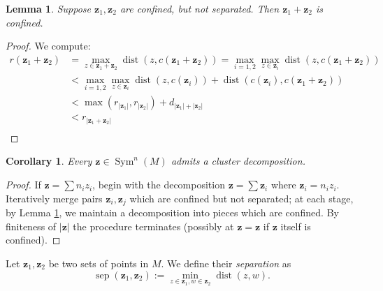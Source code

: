 \documentclass{article}
\def\C{\mathbb{C}}
\DeclareMathOperator{\Sym}{Sym}
\DeclareMathOperator{\dist}{dist}
\DeclareMathOperator{\sep}{sep}
\def\bz{\mathbf{z}} %
\newtheorem{lemma}[theorem]{Lemma}
\newtheorem{corollary}[theorem]{Corollary}
\theoremstyle{definition}
\begin{document}
\begin{lemma} \label{merging lemma}
    Suppose $\mathbf{z}_1, \mathbf{z}_2$ are confined, but not separated.  Then $\mathbf{z}_1 + \mathbf{z}_2$ is confined.  
\end{lemma}
\begin{proof} We compute: 
    \begin{align*}
    r(\mathbf{z}_1 + \mathbf{z}_2) &= \max_{z \in \mathbf{z}_1 + \mathbf{z}_2} \dist(z, c(\mathbf{z}_1 + \mathbf{z}_2)) = \max_{i=1,2} \max_{z \in \mathbf{z}_i} \dist(z, c(\mathbf{z}_1 + \mathbf{z}_2)) \\
    & < \max_{i=1,2} \max_{z \in \mathbf{z}_i} \dist(z, c(\mathbf{z}_i)) + \dist(c(\mathbf{z}_i),c(\mathbf{z}_1 + \mathbf{z}_2)) \\
    & < \max(r_{|\mathbf{z}_1|}, r_{|\mathbf{z}_2|}) + d_{|\mathbf{z}_1| + |\mathbf{z}_2|} \\
    &< r_{|\mathbf{z}_1 + \mathbf{z}_2|}\\
\end{align*}  
\end{proof}



\begin{corollary}
Every $\mathbf{z} \in \Sym^n(M)$ admits a cluster decomposition.
\end{corollary}
\begin{proof}
    If $\mathbf{z} = \sum n_i z_i$, begin with the decomposition $\mathbf{z} = \sum \mathbf{z}_i$ where $\mathbf{z}_i = n_i z_i$.      
    Iteratively merge pairs $\mathbf{z}_i, \mathbf{z}_j$ which are confined but not separated; at each stage, by Lemma \ref{merging lemma}, we maintain a decomposition into pieces which are confined.  By finiteness of $|\mathbf{z}|$ the procedure terminates (possibly at $\mathbf{z} = \mathbf{z}$ if $\mathbf{z}$ itself is confined). 
\end{proof}
Let $\bz_1, \bz_2$ be two sets of points in $M$. We define their {\em separation} as
$$ \sep(\mathbf{z}_1, \mathbf{z}_2) := \min_{z \in \mathbf{z}_1, w \in  \mathbf{z}_2 } \dist(z, w).$$
\end{document}
